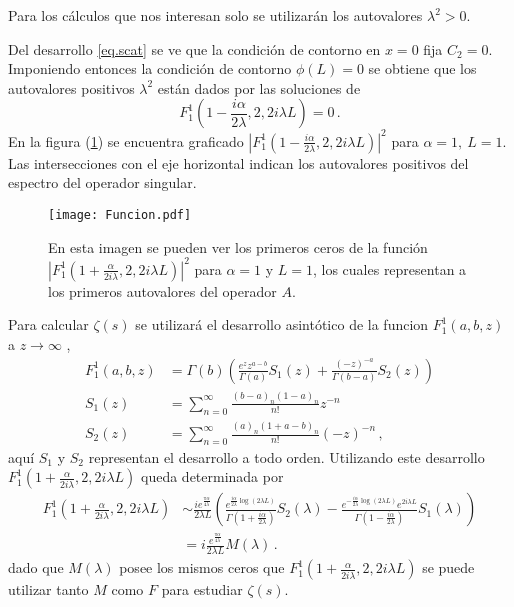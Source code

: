 Para los cálculos que nos interesan solo se utilizarán los autovalores $\lambda ^2 >0$. 

Del desarrollo \ref{eq.scat} se ve que la condición de contorno en $x=0$ fija $C _2 =0$. 
Imponiendo entonces la condición de contorno $\phi (L)=0$ se obtiene que los autovalores positivos $\lambda ^2$ están dados por las soluciones de
\begin{equation}
F _1 ^1 \left(1-\frac{i \alpha}{2 \lambda},2,2 i \lambda L \right)  = 0
	\, .
\label{eq.1}
\end{equation}
En la figura (\ref{fig:funcion}) se encuentra graficado
\mbox{$ | F _1 ^1 (1-\frac{i \alpha}{2 \lambda},2,2 i \lambda L) | ^2 $} para $\alpha=1, \ L=1$. Las intersecciones con el eje horizontal indican los autovalores positivos del espectro del operador singular.


\begin{figure}[h!]
\centering
\texttt{[image: Funcion.pdf]}
\caption{En esta imagen se pueden ver los primeros ceros de la función $| F _1 ^1 (1+\frac{ \alpha}{2 i \lambda},2,2 i \lambda L) | ^2$ para $\alpha=1$ y $L=1$, los cuales representan a los primeros autovalores del operador $A$.}
\label{fig:funcion}
\end{figure}


Para calcular $\zeta(s)$ se utilizará el desarrollo asintótico de la funcion $F _1 ^1 (a,b,z)$ a $z \rightarrow \infty$ \cite{Abramowitz:hyper},
\begin{equation}
\begin{aligned}
    F _1 ^1 (a,b,z) &= \Gamma (b) 
    \left(
    \frac{e^z z ^{a-b} }{\Gamma(a)}  S_1 (z) + \frac{(-z) ^{ -a}}{ \Gamma(b-a)} 
    S_2 (z)
    \right) \\[5pt]
    S _1 (z) &= \sum _{n=0} ^{\infty} \frac{(b-a) _n (1-a) _n}{n!} z ^{-n} \\[5pt]
    S _2 (z) &= \sum _{n=0} ^{\infty} \frac{(a) _n (1+a-b) _n}{n!} (-z) ^{-n}     
		\, ,
\end{aligned}
\label{eq.aprox}
\end{equation}
aquí $S_1$ y $S _2$ representan el desarrollo a todo orden.
Utilizando este desarrollo $F _1 ^1 \left(1+  \frac{  \alpha}{2 i \lambda} ,2 ,2 i \lambda L  \right)$ queda determinada por
\begin{align}
\label{eq.completa}
	F _1 ^1 \left(1+  \frac{  \alpha}{2 i \lambda} ,2 ,2 i \lambda L  \right) 
&	
	\sim
    \frac{i e ^{ \frac{\pi \alpha }{4 \lambda}  } }{2 \lambda L}
    \left(
    \frac{e ^{   \frac{ i \alpha}{2 \lambda}  \log (2 \lambda L) }}               {\Gamma(1+\frac{i \alpha}{2 \lambda})} S _2 ( \lambda )-
    \frac{e ^{-  \frac{i \alpha}{2 \lambda}  \log (2 \lambda L) } e ^{2 i \lambda L} }{\Gamma(1-\frac{i \alpha}{2 \lambda})} 
    S _1 ( \lambda )
    \right) 
\nonumber
\\[5pt]
&
    =  i  \frac{e ^{ \frac{\pi \alpha }{4 \lambda}  } }{2 \lambda L}     M (\lambda) 
    \, .
\end{align}
dado que $M( \lambda)$ posee los mismos ceros que $F _1 ^1 \left(1+  \frac{  \alpha}{2 i \lambda} ,2 ,2 i \lambda L  \right)$ se puede utilizar tanto $M$ como $F$ para estudiar $\zeta (s)$.


